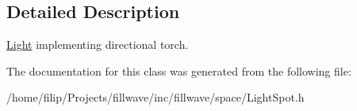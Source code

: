 \subsection{Detailed Description}
\hyperlink{classflw_1_1flf_1_1Light}{Light} implementing directional torch. 

The documentation for this class was generated from the following file\+:\begin{DoxyCompactItemize}
\item 
/home/filip/\+Projects/fillwave/inc/fillwave/space/Light\+Spot.\+h\end{DoxyCompactItemize}

